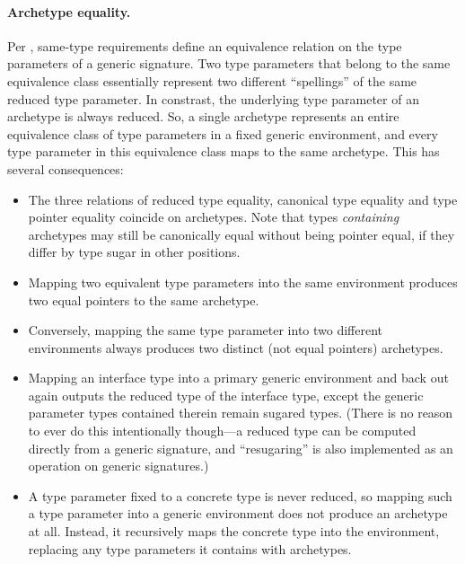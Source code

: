 \documentclass[../generics]{subfiles}
\begin{document}
\paragraph{Archetype equality.} Per , same-type requirements define an equivalence relation on the type parameters of a generic signature. Two type parameters that belong to the same equivalence class essentially represent two different ``spellings'' of the same reduced type parameter. In constrast, the underlying type parameter of an archetype is always reduced. So, a single archetype represents an entire equivalence class of type parameters in a fixed generic environment, and every type parameter in this equivalence class maps to the same archetype. This has several consequences:
\begin{itemize}
\item The three relations of reduced type equality, canonical type equality and type pointer equality coincide on archetypes. Note that types \emph{containing} archetypes may still be canonically equal without being pointer equal, if they differ by type sugar in other positions.

\item Mapping two equivalent type parameters into the same environment produces two equal pointers to the same archetype.

\item Conversely, mapping the same type parameter into two different environments always produces two distinct (not equal pointers) archetypes.

\item Mapping an interface type into a primary generic environment and back out again outputs the reduced type of the interface type, except the generic parameter types contained therein remain sugared types. (There is no reason to ever do this intentionally though---a reduced type can be computed directly from a generic signature, and ``resugaring'' is also implemented as an operation on generic signatures.)

\item A type parameter fixed to a concrete type is never reduced, so mapping such a type parameter into a generic environment does not produce an archetype at all. Instead, it recursively maps the concrete type into the environment, replacing any type parameters it contains with archetypes.
\end{itemize}
\end{document}
